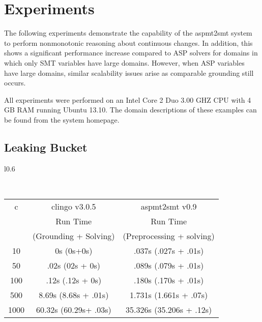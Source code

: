 \documentclass[runningheads]{llncs}
\newcommand{\cblu}{\color{blue}}
\begin{document}
\section{Experiments}\label{sec:experiment}

The following experiments demonstrate the capability of the {\sc aspmt2smt}
system to perform nonmonotonic reasoning about continuous changes. In addition, this shows a significant performance increase compared to ASP solvers for domains in which only SMT variables have large domains. However, when ASP variables have large domains, similar scalability issues arise as comparable grounding still occurs. 


All experiments were performed on an Intel Core
2 Duo 3.00 GHZ CPU with 4 GB RAM running Ubuntu 13.10.
%
The domain descriptions of these examples can be found from the system
homepage. 

\subsection{Leaking Bucket}


\begin{wrapfigure}{l}{0.6\textwidth}
{\footnotesize
\ \\\begin{tabular}{|c|c|c|}
\hline 
c & {\sc clingo} v3.0.5 & {\sc aspmt2smt} v0.9 \\ 
 &  Run Time   & Run Time  \\  
 & (Grounding + Solving) & (Preprocessing + solving)   \\\hline\hline
10 & 0s (0s+0s) & .037s (.027s + .01s) \\\hline
50 & .02s (02s + 0s) & .089s (.079s + .01s) \\\hline
100 & .12s (.12s + 0s) & .180s (.170s + .01s) \\\hline
500 & 8.69s (8.68s + .01s) & 1.731s (1.661s + .07s) \\\hline
1000 & 60.32s (60.29s+ .03s) & 35.326s (35.206s + .12s) \\\hline
\end{tabular}
}
\end{wrapfigure}
\end{document}
